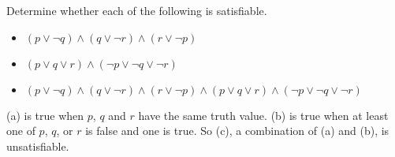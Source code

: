 \begin{ex}
  Determine whether each of the following is satisfiable.
  \begin{itemize}
    \item[a) ] \( (p \lor \neg q) \land (q \lor \neg r) \land (r \lor \neg p) \)
    \item[b) ]  \((p \lor q \lor r) \land (\neg p \lor \neg q \lor \neg r) \)
    \item[c) ]  \( (p \lor \neg q) \land (q \lor \neg r) \land (r \lor \neg p) \land (p \lor q \lor r) \land (\neg p \lor \neg q \lor \neg r)\)
  \end{itemize}
  \begin{sol}
    (a) is true when \(p\), \(q\) and \(r\) have the same truth value.
    (b) is true when at least one of \(p\), \(q\), or \(r\) is false and one is true.
    So (c), a combination of (a) and (b), is unsatisfiable.
  \end{sol}
\end{ex}


